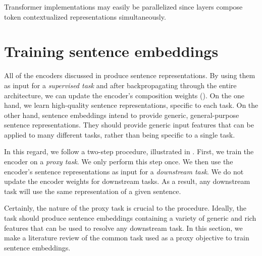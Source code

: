 Transformer implementations may easily be parallelized since layers compose token contextualized representations simultaneously.


\section{Training sentence embeddings}



All of the encoders discussed in  produce sentence representations. By using them as input for a \textit{supervised task} and after backpropagating through the entire architecture, we can update the encoder’s composition weights (). On the one hand, we learn high-quality sentence representations, specific to each task. On the other hand, sentence embeddings intend to provide generic, general-purpose sentence representations. They should provide generic input features that can be applied to many different tasks, rather than being specific to a single task.

In this regard, we follow a two-step procedure, illustrated in . First, we train the encoder on a \textit{proxy task}. We only perform this step once. We then use the encoder's sentence representations as input for a \textit{downstream task}. We do not update the encoder weights for downstream tasks. As a result, any downstream task will use the same representation of a given sentence.

Certainly, the nature of the proxy task is crucial to the procedure. Ideally, the task should produce sentence embeddings containing a variety of generic and rich features that can be used to resolve any downstream task. In this section, we make a literature review of the common task used as a proxy objective to train sentence embeddings.

